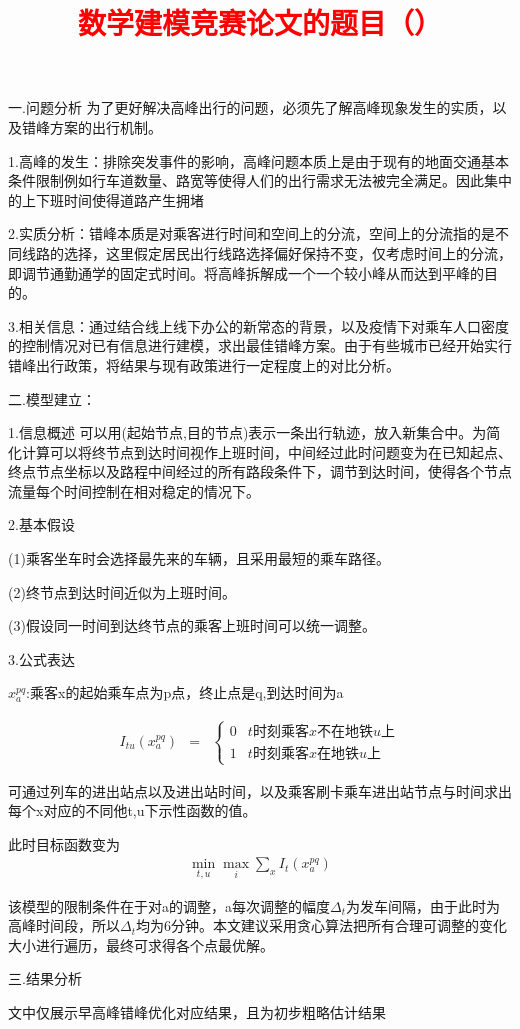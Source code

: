 \documentclass[12pt,a4paper]{mcmthesis}
\title{\textcolor{red}{数学建模竞赛论文的题目（）}}
\date{}
\begin{document}
一.问题分析
为了更好解决高峰出行的问题，必须先了解高峰现象发生的实质，以及错峰方案的出行机制。

1.高峰的发生：排除突发事件的影响，高峰问题本质上是由于现有的地面交通基本条件限制例如行车道数量、路宽等使得人们的出行需求无法被完全满足。因此集中的上下班时间使得道路产生拥堵

2.实质分析：错峰本质是对乘客进行时间和空间上的分流，空间上的分流指的是不同线路的选择，这里假定居民出行线路选择偏好保持不变，仅考虑时间上的分流，即调节通勤通学的固定式时间。将高峰拆解成一个一个较小峰从而达到平峰的目的。

3.相关信息：通过结合线上线下办公的新常态的背景，以及疫情下对乘车人口密度的控制情况对已有信息进行建模，求出最佳错峰方案。由于有些城市已经开始实行错峰出行政策，将结果与现有政策进行一定程度上的对比分析。

二.模型建立：

1.信息概述
可以用(起始节点,目的节点)表示一条出行轨迹，放入新集合中。为简化计算可以将终节点到达时间视作上班时间，中间经过此时问题变为在已知起点、终点节点坐标以及路程中间经过的所有路段条件下，调节到达时间，使得各个节点流量每个时间控制在相对稳定的情况下。

2.基本假设

(1)乘客坐车时会选择最先来的车辆，且采用最短的乘车路径。

(2)终节点到达时间近似为上班时间。

(3)假设同一时间到达终节点的乘客上班时间可以统一调整。

3.公式表达

$x_{a}^{pq}$:乘客x的起始乘车点为p点，终止点是q,到达时间为a

\begin{eqnarray}
 I_{tu}(x_{a}^{pq}) & = & \left\{\begin{matrix}
  0& t时刻乘客x不在地铁u上 \\
  1& t时刻乘客x在地铁u上
\end{matrix}\right.
\end{eqnarray}

可通过列车的进出站点以及进出站时间，以及乘客刷卡乘车进出站节点与时间求出每个x对应的不同他t,u下示性函数的值。

此时目标函数变为
\begin{align}
  \min_{t,u}\max_{i} \sum_{x} I_{t}(x_{a}^{pq})
\end{align}

该模型的限制条件在于对a的调整，a每次调整的幅度$\Delta _{t}$为发车间隔，由于此时为高峰时间段，所以$\Delta _{t}$均为6分钟。本文建议采用贪心算法把所有合理可调整的变化大小进行遍历，最终可求得各个点最优解。

三.结果分析

文中仅展示早高峰错峰优化对应结果，且为初步粗略估计结果
\end{document}
